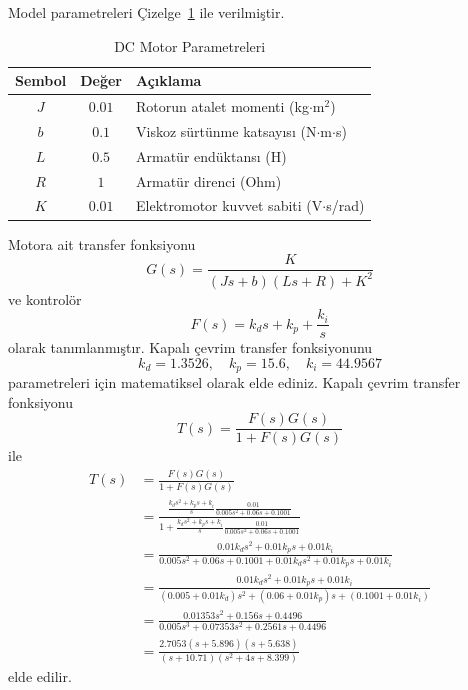 Model parametreleri Çizelge~\ref{tbl:motor} ile verilmiştir.
\begin{table}[h!]
    \centering
    \caption{DC Motor Parametreleri}
    \label{tbl:motor}
    \begin{tabular}{|c|c|l|}
    \hline
    \textbf{Sembol} & \textbf{Değer} & \textbf{Açıklama} \\
    \hline
    $J$ & $0.01$ & Rotorun atalet momenti (kg$\cdot$m$^2$) \\
    $b$ & $0.1$ & Viskoz sürtünme katsayısı (N$\cdot$m$\cdot$s) \\
    $L$ & $0.5$ & Armatür endüktansı (H) \\
    $R$ & $1$ & Armatür direnci (Ohm) \\
    $K$ & $0.01$ & Elektromotor kuvvet sabiti (V$\cdot$s/rad) \\
    \hline
    \end{tabular}
\end{table}
Motora ait transfer fonksiyonu
\begin{equation}
    G(s)=\frac{K}{(Js+b)(Ls+R)+K^2}
\end{equation}
ve kontrolör
\begin{equation}
    F(s)=k_d s+k_p+\frac{k_i}{s}
\end{equation}
olarak tanımlanmıştır. Kapalı çevrim transfer fonksiyonunu 
\begin{equation}
    k_d=1.3526,\quad k_p=15.6,\quad k_i=44.9567
\end{equation}
parametreleri için matematiksel olarak elde ediniz. Kapalı çevrim transfer fonksiyonu
\begin{equation}
    T(s)=\frac{F(s)G(s)}{1+F(s)G(s)}
\end{equation}
ile
\begin{equation}
\begin{split}
    T(s)&=\frac{F(s)G(s)}{1+F(s)G(s)}\\
    &=\frac{\frac{k_ds^2+k_ps+k_i}{s}\frac{0.01}{0.005 s^2 + 0.06 s + 0.1001}}{1+\frac{k_ds^2+k_ps+k_i}{s}\frac{0.01}{0.005 s^2 + 0.06 s + 0.1001}}\\
    &=\frac{0.01k_ds^2+0.01k_ps+0.01k_i}{0.005 s^2 + 0.06 s + 0.1001+0.01k_ds^2+0.01k_ps+0.01k_i}\\
    &=\frac{0.01k_ds^2+0.01k_ps+0.01k_i}{(0.005+0.01k_d) s^2 + (0.06+0.01k_p) s + (0.1001+0.01k_i)}\\
    &=\frac{0.01353 s^2 + 0.156 s + 0.4496}{0.005 s^3 + 0.07353 s^2 + 0.2561 s + 0.4496}\\
    &=\frac{2.7053 (s+5.896) (s+5.638)}{(s+10.71) (s^2 + 4s + 8.399)}
\end{split}
\end{equation}
elde edilir.

